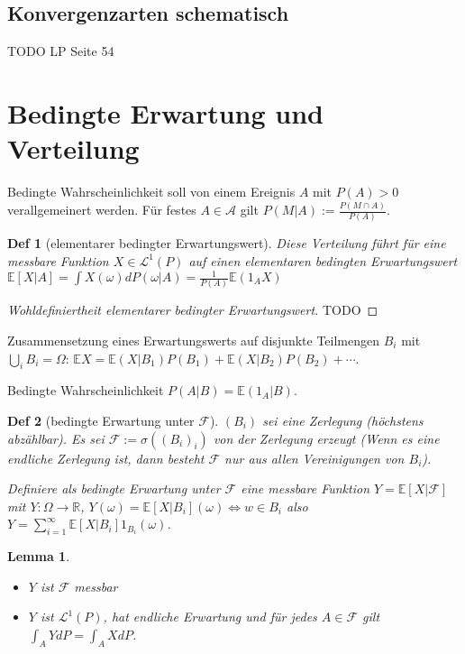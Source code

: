 \documentclass[]{article}
\newtheorem{lemma}{Lemma}
\newtheorem*{definition*}{Def}
\begin{document}
\subsection{Konvergenzarten schematisch}
TODO LP Seite 54

\section{Bedingte Erwartung und Verteilung}
Bedingte Wahrscheinlichkeit soll von einem Ereignis $A$ mit $P(A)>0$ verallgemeinert werden. Für festes $A\in\mathcal{A}$ gilt $P(M|A):=\frac{P(M\cap A)}{P(A)}$.
\begin{definition*}[elementarer bedingter Erwartungswert]
	Diese Verteilung führt für eine messbare Funktion $X\in\mathcal{L}^1(P)$ auf einen elementaren bedingten Erwartungswert $\mathbb{E}[X|A]=\int X(\omega) dP(\omega|A) = \frac{1}{P(A)}\mathbb{E}(1_A X)$
\end{definition*}

\begin{proof}[Wohldefiniertheit elementarer bedingter Erwartungswert]
	TODO
\end{proof}

Zusammensetzung eines Erwartungswerts auf disjunkte Teilmengen $B_i$ mit $\bigcup_i B_i = \Omega$: $\mathbb{E}X = \mathbb{E}(X|B_1)P(B_1) + \mathbb{E}(X|B_2)P(B_2)+\cdots$.

Bedingte Wahrscheinlichkeit $P(A|B)=\mathbb{E}(1_A|B)$.



\begin{definition*}[bedingte Erwartung unter $\mathcal{F}$]
	$(B_i)$ sei eine Zerlegung (höchstens abzählbar). Es sei $\mathcal{F}:=\sigma((B_i)_i)$ von der Zerlegung erzeugt (Wenn es eine endliche Zerlegung ist, dann besteht $\mathcal{F}$ nur aus allen Vereinigungen von $B_i$).
	
	Definiere als bedingte Erwartung unter $\mathcal{F}$ eine messbare Funktion $Y=\mathbb{E}[X|\mathcal{F}]$ mit $Y:\Omega\rightarrow\mathbb{R}$, $Y(\omega)=\mathbb{E}[X|B_i](\omega) \iff w \in B_i$ also $Y=\sum_{i=1}^{\infty} \mathbb{E}[X|B_i]1_{B_i}(\omega)$.
\end{definition*}

\begin{lemma}
	\begin{itemize}
		\item $Y$ ist $\mathcal{F}$ messbar
		\item $Y$ ist $\mathcal{L}^1(P)$, hat endliche Erwartung und für jedes $A\in \mathcal{F}$ gilt $\int_A Y dP = \int_A X dP$.
	\end{itemize}
\end{lemma}
\end{document}
